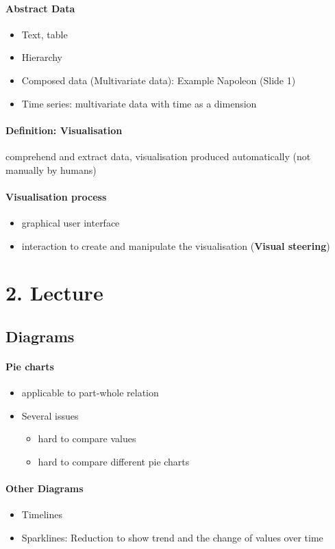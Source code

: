 \documentclass[ngerman]{scrartcl}
\begin{document}
\paragraph{Abstract Data}
\begin{itemize}
  \item Text, table
  \item Hierarchy
  \item Composed data (Multivariate data): Example Napoleon (Slide 1)
  \item Time series: multivariate data with time as a dimension
\end{itemize}
\paragraph*{Definition: Visualisation} 
comprehend and extract data, visualisation produced automatically (not manually by humans)
\paragraph*{Visualisation process} 
\begin{itemize}
  \item graphical user interface
  \item interaction to create and manipulate the visualisation (\textbf{Visual steering})
\end{itemize}

\section{2. Lecture}

\subsection{Diagrams}
\paragraph{Pie charts}
\begin{itemize}
  \item applicable to part-whole relation
  \item Several issues 
  \begin{itemize}
    \item hard to compare values
    \item hard to compare different pie charts
  \end{itemize}
\end{itemize}
\paragraph{Other Diagrams}
\begin{itemize}
  \item Timelines
  \item Sparklines: Reduction to show trend and the change of values over time
\end{itemize}
\end{document}
